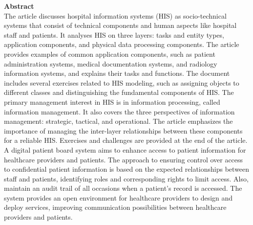 \vspace*{2cm}
{\bf\Large Abstract} \\ [1em]
The article discusses hospital information systems (HIS) as socio-technical systems that consist of technical components and human aspects like hospital staff and patients. It analyses HIS on three layers: tasks and entity types, application components, and physical data processing components. The article provides examples of common application components, such as patient administration systems, medical documentation systems, and radiology information systems, and explains their tasks and functions. The document includes several exercises related to HIS modeling, such as assigning objects to different classes and distinguishing the fundamental components of HIS. The primary management interest in HIS is in information processing, called information management. It also covers the three perspectives of information management: strategic, tactical, and operational. The article emphasizes the importance of managing the inter-layer relationships between these components for a reliable HIS. Exercises and challenges are provided at the end of the article. A digital patient board system aims to enhance access to patient information for healthcare providers and patients. The approach to ensuring control over access to confidential patient information is based on the expected relationships between staff and patients, identifying roles and corresponding rights to limit access. Also, maintain an audit trail of all occasions when a patient's record is accessed. The system provides an open environment for healthcare providers to design and deploy services, improving communication possibilities between healthcare providers and patients.

\cleardoublepage
